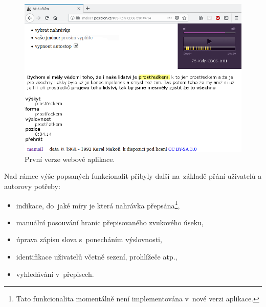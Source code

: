 \begin{figure}[htpb]
\includegraphics[scale=0.8]{rc/makonfm-cs-1.png}
\caption{První verze webové aplikace.}
\label{fig:prototyp}
\end{figure}



Nad rámec výše popsaných funkcionalit přibyly další na~základě přání uživatelů a
autorovy potřeby:

\begin{itemize}
\item{indikace, do~jaké míry je která nahrávka
přepsána\footnote{\label{fn:not-in-v2}Tato
funkcionalita momentálně není implementována v~nové verzi aplikace.},}
\item{manuální posouvání hranic přepisovaného zvukového
úseku,}
\item{úprava zápisu slova s~ponecháním výslovnosti,}
\item{identifikace uživatelů včetně sezení, prohlížeče atp.,}
\item{vyhledávání v~přepisech.}
\end{itemize}

